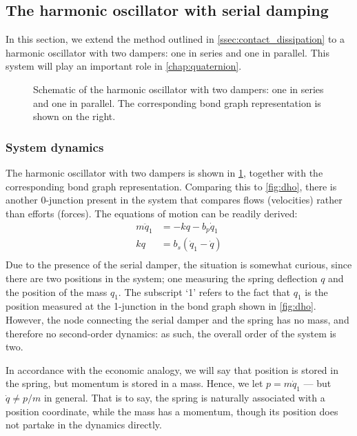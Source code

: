 \subsection{The harmonic oscillator with serial damping}
\label{ssec:serial_damping}
In this section, we extend the method outlined in \cref{ssec:contact_dissipation} to a harmonic oscillator with two dampers: one in series and one in parallel. This system will play an important role in \cref{chap:quaternion}.
\begin{figure}[ht!]
    \centering
    
    \caption{Schematic of the harmonic oscillator with two dampers: one in series and one in parallel. The corresponding bond graph representation is shown on the right.}
    \label{fig:double_damped_osc}
\end{figure}

\subsubsection{System dynamics}
The harmonic oscillator with two dampers is shown in \cref{fig:double_damped_osc}, together with the corresponding bond graph representation. Comparing this to \cref{fig:dho}, there is another 0-junction present in the system that compares flows (velocities) rather than efforts (forces). The equations of motion can be readily derived:
\begin{equation}
    \begin{split}
        m\ddot{q}_1 &= -kq - b_p \dot{q}_1 \\
        kq &= b_s(\dot{q}_1 - \dot{q}) \\
    \end{split}
    \label{eq:serial_eom_raw}
\end{equation}
Due to the presence of the serial damper, the situation is somewhat curious, since there are two positions in the system; one measuring the spring deflection \(q\) and the position of the mass \(q_1\). The subscript `1' refers to the fact that \(q_1\) is the position measured at the 1-junction in the bond graph shown in \cref{fig:dho}. However, the node connecting the serial damper and the spring has no mass, and therefore no second-order dynamics: as such, the overall order of the system is two. 

In accordance with the economic analogy, we will say that position is stored in the spring, but momentum is stored in a mass.
Hence, we let \(p = m\dot{q}_1\) --- but \(\dot{q} \neq p/m\) in general. That is to say, the spring is naturally associated with a position coordinate, while the mass has a momentum, though its position does not partake in the dynamics directly.

